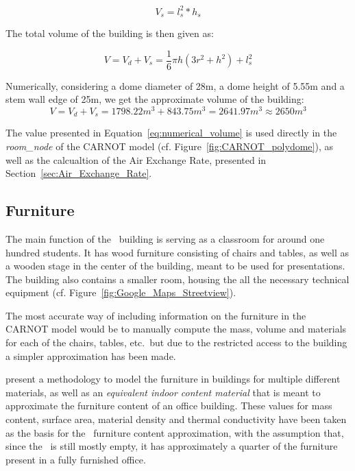 \begin{equation}
    V_s = l_s^2 * h_s
\end{equation}

The total volume of the building is then given as: 

\begin{equation}
    V = V_d + V_s = \frac{1}{6} \pi h (3r^2 + h^2) + l_s^2
\end{equation}

Numerically, considering a dome diameter of 28m, a dome height of 5.55m and a stem
wall edge of 25m, we get the approximate volume of the building:
\begin{equation}\label{eq:numerical_volume}
    V = V_d + V_s = 1798.22m^3 + 843.75m^3 = 2641.97m^3 \approx 2650m^3
\end{equation}

The value presented in Equation~\ref{eq:numerical_volume} is used directly in
the \textit{room\_node} of the CARNOT model (cf.
Figure~\ref{fig:CARNOT_polydome}), as well as the calcualtion of the Air
Exchange Rate, presented in Section~\ref{sec:Air_Exchange_Rate}.

\subsection{Furniture}

The main function of the \pdome\ building is serving as a classroom for around
one hundred students. It has wood furniture consisting of chairs and tables, as
well as a wooden stage in the center of the building, meant to be used for
presentations. The building also contains a smaller room, housing the all the
necessary technical equipment (cf. Figure~\ref{fig:Google_Maps_Streetview}).

The most accurate way of including information on the furniture in the CARNOT
model would be to manually compute the mass, volume and materials for each of
the chairs, tables, etc.\ but due to the restricted access to the building a
simpler approximation has been made.

\textcite{johraNumericalAnalysisImpact2017} present a methodology to model the
furniture in buildings for multiple different materials, as well as an
\textit{equivalent indoor content material} that is meant to approximate the
furniture content of an office building. These values for mass content, surface
area, material density and thermal conductivity have been taken as the basis for
the \pdome\ furniture content approximation, with the assumption that, since the
\pdome\ is still mostly empty, it has approximately a quarter of the furniture
present in a fully furnished office.

